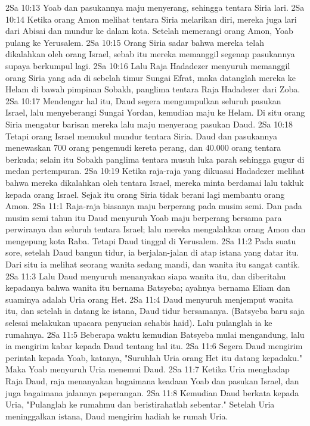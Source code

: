 2Sa 10:13  Yoab dan pasukannya maju menyerang, sehingga tentara Siria lari.
2Sa 10:14  Ketika orang Amon melihat tentara Siria melarikan diri, mereka juga lari dari Abisai dan mundur ke dalam kota. Setelah memerangi orang Amon, Yoab pulang ke Yerusalem.
2Sa 10:15  Orang Siria sadar bahwa mereka telah dikalahkan oleh orang Israel, sebab itu mereka memanggil segenap pasukannya supaya berkumpul lagi.
2Sa 10:16  Lalu Raja Hadadezer menyuruh memanggil orang Siria yang ada di sebelah timur Sungai Efrat, maka datanglah mereka ke Helam di bawah pimpinan Sobakh, panglima tentara Raja Hadadezer dari Zoba.
2Sa 10:17  Mendengar hal itu, Daud segera mengumpulkan seluruh pasukan Israel, lalu menyeberangi Sungai Yordan, kemudian maju ke Helam. Di situ orang Siria mengatur barisan mereka lalu maju menyerang pasukan Daud.
2Sa 10:18  Tetapi orang Israel memukul mundur tentara Siria. Daud dan pasukannya menewaskan 700 orang pengemudi kereta perang, dan 40.000 orang tentara berkuda; selain itu Sobakh panglima tentara musuh luka parah sehingga gugur di medan pertempuran.
2Sa 10:19  Ketika raja-raja yang dikuasai Hadadezer melihat bahwa mereka dikalahkan oleh tentara Israel, mereka minta berdamai lalu takluk kepada orang Israel. Sejak itu orang Siria tidak berani lagi membantu orang Amon.
2Sa 11:1  Raja-raja biasanya maju berperang pada musim semi. Dan pada musim semi tahun itu Daud menyuruh Yoab maju berperang bersama para perwiranya dan seluruh tentara Israel; lalu mereka mengalahkan orang Amon dan mengepung kota Raba. Tetapi Daud tinggal di Yerusalem.
2Sa 11:2  Pada suatu sore, setelah Daud bangun tidur, ia berjalan-jalan di atap istana yang datar itu. Dari situ ia melihat seorang wanita sedang mandi, dan wanita itu sangat cantik.
2Sa 11:3  Lalu Daud menyuruh menanyakan siapa wanita itu, dan diberitahu kepadanya bahwa wanita itu bernama Batsyeba; ayahnya bernama Eliam dan suaminya adalah Uria orang Het.
2Sa 11:4  Daud menyuruh menjemput wanita itu, dan setelah ia datang ke istana, Daud tidur bersamanya. (Batsyeba baru saja selesai melakukan upacara penyucian sehabis haid). Lalu pulanglah ia ke rumahnya.
2Sa 11:5  Beberapa waktu kemudian Batsyeba mulai mengandung, lalu ia mengirim kabar kepada Daud tentang hal itu.
2Sa 11:6  Segera Daud mengirim perintah kepada Yoab, katanya, "Suruhlah Uria orang Het itu datang kepadaku." Maka Yoab menyuruh Uria menemui Daud.
2Sa 11:7  Ketika Uria menghadap Raja Daud, raja menanyakan bagaimana keadaan Yoab dan pasukan Israel, dan juga bagaimana jalannya peperangan.
2Sa 11:8  Kemudian Daud berkata kepada Uria, "Pulanglah ke rumahmu dan beristirahatlah sebentar." Setelah Uria meninggalkan istana, Daud mengirim hadiah ke rumah Uria.
